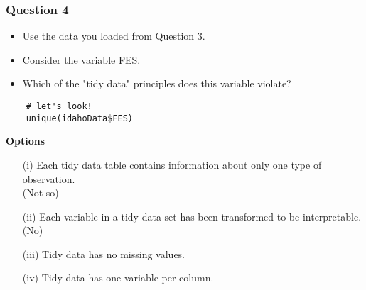 \documentclass{beamer}
\begin{document}
\begin{frame}[fragile]
\frametitle{Question 4}

\begin{itemize}
	\item Use the data you loaded from Question 3. 
	\item Consider the variable FES. 
	\item Which of the "tidy data" principles does this variable violate?
\end{itemize}

%

\begin{framed} 
	\begin{verbatim}
	# let's look!
	unique(idahoData$FES)
	\end{verbatim}
\end{framed} 

\end{frame}

\begin{frame}


\textbf{Options}
\begin{itemize}
	\item[(i)]  Each tidy data table contains information about only one type of observation.\\
	(Not so)
	
	\item[(ii)]  Each variable in a tidy data set has been transformed to be interpretable.
	(No)
	
	\item[(iii)]  Tidy data has no missing values.
	
	\item[(iv)]  Tidy data has one variable per column.
\end{itemize}
\end{frame}
\end{document}
